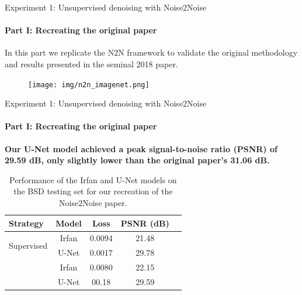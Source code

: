 \documentclass[]{beamer}
\begin{document}
\begin{frame}{Experiment 1: Unsupervised denoising with Noise2Noise}
    \framesubtitle{Part I: Recreating the original paper}

    In this part we replicate the N2N framework to validate the original methodology and results presented in the seminal 2018 paper. 
    

    \vspace{0.5cm}

    \begin{figure}
        \centering
        \texttt{[image: img/n2n\_imagenet.png]}
     \end{figure}
\end{frame}

\begin{frame}{Experiment 1: Unsupervised denoising with Noise2Noise}
    \framesubtitle{Part I: Recreating the original paper}
    
    
    
    \textbf{Our U-Net model achieved a peak signal-to-noise ratio (PSNR) of 29.59 dB, only slightly lower than the original paper's 31.06 dB.} %
    \vspace{1em}

    \begin{table}[htbp] 
        \centering 
        \scriptsize
        \captionsetup{font=scriptsize}
        \caption{Performance of the Irfan and U-Net models on the BSD testing set for our recreation of the Noise2Noise paper.} 
            \begin{tabular}{lcccc} 
            \toprule 
            \textbf{Strategy} & \textbf{Model} & \textbf{Loss} & \textbf{PSNR (dB)} \\ \midrule 
            \multirow{2}{*}{Supervised} & Irfan & 0.0094 & 21.48 \\
            & U-Net & 0.0017 & 29.78 \\
            \addlinespace
            \multirow{2}{*}{Noise2Noise} & Irfan & 0.0080 & 22.15\\
            & U-Net & 00.18 & 29.59\\ \bottomrule
            \end{tabular} 
    \end{table}
\end{frame}
\end{document}
